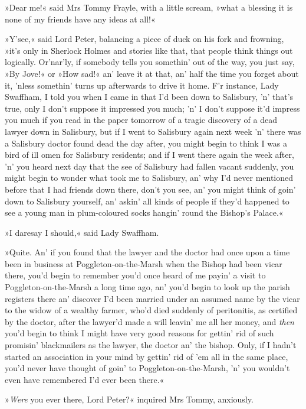 »Dear me!« said Mrs Tommy Frayle, with a little scream, »what a blessing it is none of my friends have any ideas at all!«

»Y'see,« said Lord Peter, balancing a piece of duck on his fork and frowning, »it's only in Sherlock Holmes and stories like that, that people think things out logically. Or'nar'ly, if somebody tells you somethin' out of the way, you just say, »By Jove!« or »How sad!« an' leave it at that, an' half the time you forget about it, 'nless somethin' turns up afterwards to drive it home. F'r instance, Lady Swaffham, I told you when I came in that I'd been down to Salisbury, 'n' that's true, only I don't suppose it impressed you much; 'n' I don't suppose it'd impress you much if you read in the paper tomorrow of a tragic discovery of a dead lawyer down in Salisbury, but if I went to Salisbury again next week 'n' there was a Salisbury doctor found dead the day after, you might begin to think I was a bird of ill omen for Salisbury residents; and if I went there again the week after, 'n' you heard next day that the see of Salisbury had fallen vacant suddenly, you might begin to wonder what took me to Salisbury, an' why I'd never mentioned before that I had friends down there, don't you see, an' you might think of goin' down to Salisbury yourself, an' askin' all kinds of people if they'd happened to see a young man in plum-coloured socks hangin' round the Bishop's Palace.«

»I daresay I should,« said Lady Swaffham.

»Quite. An' if you found that the lawyer and the doctor had once upon a time been in business at Poggleton-on-the-Marsh when the Bishop had been vicar there, you'd begin to remember you'd once heard of me payin' a visit to Poggleton-on-the-Marsh a long time ago, an' you'd begin to look up the parish registers there an' discover I'd been married under an assumed name by the vicar to the widow of a wealthy farmer, who'd died suddenly of peritonitis, as certified by the doctor, after the lawyer'd made a will leavin' me all her money, and \textit{then} you'd begin to think I might have very good reasons for gettin' rid of such promisin' blackmailers as the lawyer, the doctor an' the bishop. Only, if I hadn't started an association in your mind by gettin' rid of 'em all in the same place, you'd never have thought of goin' to Poggleton-on-the-Marsh, 'n' you wouldn't even have remembered I'd ever been there.«

»\textit{Were} you ever there, Lord Peter?« inquired Mrs Tommy, anxiously.


